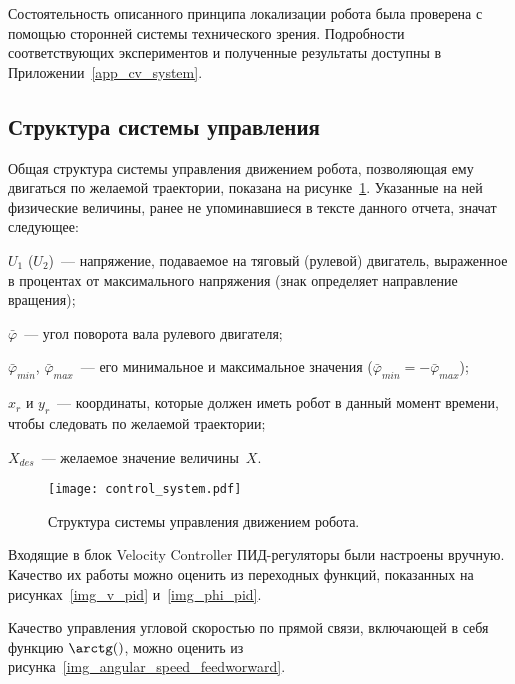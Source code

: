 Состоятельность описанного принципа локализации робота была проверена с помощью сторонней системы технического зрения.
Подробности соответствующих экспериментов и полученные результаты доступны в Приложении~\ref{app_cv_system}.



\subsection{Структура системы управления}
Общая структура системы управления движением робота, позволяющая ему двигаться по желаемой траектории, показана на рисунке~\ref{img_control_system}.
Указанные на ней физические величины, ранее не упоминавшиеся в тексте данного отчета, значат следующее:
\begin{ESKDexplanation}
    \item $U_1$ ($U_2$)~--- напряжение, подаваемое на тяговый (рулевой) двигатель, выраженное в процентах от максимального напряжения (знак определяет направление вращения);
    \item $\bar\varphi$~--- угол поворота вала рулевого двигателя;
    \item $\bar{\varphi}_{min}$, $\bar{\varphi}_{max}$~--- его минимальное и максимальное значения ($\bar{\varphi}_{min} = -\bar{\varphi}_{max}$);
    \item $x_r$ и $y_r$~--- координаты, которые должен иметь робот в данный момент времени, чтобы следовать по желаемой траектории;
    \item $X_{des}$~--- желаемое значение величины~$X$.
\end{ESKDexplanation}

\begin{figure}[h]
    \centering
    \texttt{[image: control\_system.pdf]}
    \vspace{0.0cm}
    \caption{Структура системы управления движением робота.}
    \label{img_control_system}
\end{figure}

Входящие в блок Velocity Controller ПИД-регуляторы были настроены вручную.
Качество их работы можно оценить из переходных функций, показанных на рисунках~\ref{img_v_pid} и~\ref{img_phi_pid}.

Качество управления угловой скоростью по прямой связи, включающей в себя функцию $\arctg()$, можно оценить из рисунка~\ref{img_angular_speed_feedworward}.

